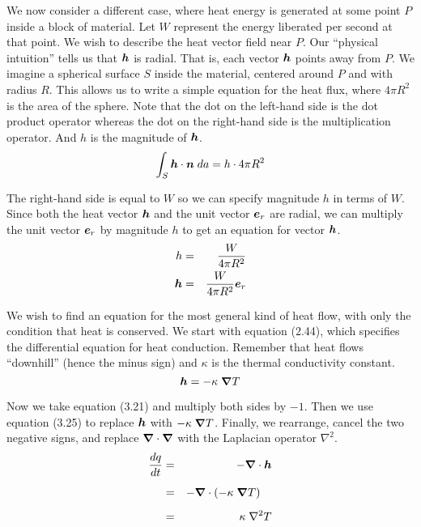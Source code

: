 We now consider a different case, where heat energy is generated 
at some point $P$ inside a block of material.
Let $W$ represent the energy liberated per second at that point.
We wish to describe the heat vector field near $P$.
Our ``physical intuition'' tells us that $\boldsymbol{h}$ is radial.
That is, each vector $\boldsymbol{h}$ points away from $P$.
We imagine a spherical surface $S$ inside the material, 
centered around $P$ and with radius $R$.
This allows us to write a simple equation for the heat flux,
where $4 \pi R^2$ is the area of the sphere.
Note that the dot on the left-hand side is the dot product operator
whereas the dot on the right-hand side is the multiplication operator.
And $h$ is the magnitude of $\boldsymbol{h}$.
\begin{equation}
  \int_S \boldsymbol{h} \cdot \boldsymbol{n} \; da = h \cdot 4 \pi R^2
\end{equation}

The right-hand side is equal to $W$ so we can specify magnitude $h$ in terms of $W$.
Since both the heat vector $\boldsymbol{h}$ and the unit vector $\boldsymbol{e}_r$ are radial,
we can multiply the unit vector $\boldsymbol{e}_r$ by magnitude $h$ to get an equation for vector $\boldsymbol{h}$.
\begin{eqnarray}
  h &=& \frac{W}{4 \pi R^2} \nonumber\\
  \boldsymbol{h} &=& \frac{W}{4 \pi R^2} \boldsymbol{e}_r
\end{eqnarray}

We wish to find an equation for the most general kind of heat flow,
with only the condition that heat is conserved.
We start with equation (2.44), which specifies the differential equation for heat conduction.
Remember that heat flows ``downhill'' (hence the minus sign)
and $\kappa$ is the thermal conductivity constant.
\begin{equation}
  \boldsymbol{h} = - \kappa \; \boldsymbol{\nabla} T
\end{equation}

Now we take equation (3.21) and multiply both sides by $-1$.
Then we use equation (3.25) to replace $\boldsymbol{h}$ with $-\kappa\;\boldsymbol{\nabla} T$.
Finally, we rearrange, cancel the two negative signs,
and replace $\boldsymbol{\nabla} \cdot \boldsymbol{\nabla}$ with the Laplacian operator $\nabla^2$.
\begin{eqnarray}
  \frac{dq}{dt} &=& - \boldsymbol{\nabla} \cdot \boldsymbol{h} \nonumber\\
  &=& - \boldsymbol{\nabla} \cdot (- \kappa \; \boldsymbol{\nabla} T) \phantom{\int} \nonumber\\
  &=& \kappa \; \nabla^2 T
\end{eqnarray}

